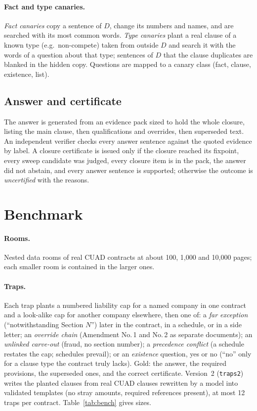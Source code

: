 \documentclass[11pt]{article}
\begin{document}
\paragraph{Fact and type canaries.} \emph{Fact canaries} copy a sentence of $D$, change its numbers and names, and are searched with its most common words. \emph{Type canaries} plant a real clause of a known type (e.g.\ non-compete) taken from outside $D$ and search it with the words of a question about that type; sentences of $D$ that the clause duplicates are blanked in the hidden copy. Questions are mapped to a canary class (fact, clause, existence, list).

\subsection{Answer and certificate}
The answer is generated from an evidence pack sized to hold the whole closure, listing the main clause, then qualifications and overrides, then superseded text. An independent verifier checks every answer sentence against the quoted evidence by label. A closure certificate is issued only if the closure reached its fixpoint, every sweep candidate was judged, every closure item is in the pack, the answer did not abstain, and every answer sentence is supported; otherwise the outcome is \emph{uncertified} with the reasons.

\section{Benchmark}
\label{sec:benchmark}

\paragraph{Rooms.} Nested data rooms of real CUAD contracts \citep{hendrycks2021cuad} at about 100, 1,000 and 10,000 pages; each smaller room is contained in the larger ones.

\paragraph{Traps.} Each trap plants a numbered liability cap for a named company in one contract and a look-alike cap for another company elsewhere, then one of: a \emph{far exception} (``notwithstanding Section $N$'') later in the contract, in a schedule, or in a side letter; an \emph{override chain} (Amendment No.\,1 and No.\,2 as separate documents); an \emph{unlinked carve-out} (fraud, no section number); a \emph{precedence conflict} (a schedule restates the cap; schedules prevail); or an \emph{existence} question, yes or no (``no'' only for a clause type the contract truly lacks). Gold: the answer, the required provisions, the superseded ones, and the correct certificate. Version~2 (\texttt{traps2}) writes the planted clauses from real CUAD clauses rewritten by a model into validated templates (no stray amounts, required references present), at most 12 traps per contract. Table~\ref{tab:bench} gives sizes.
\end{document}
